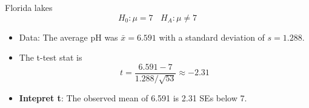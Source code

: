 \documentclass[
  10pt,
  ignorenonframetext,
]{beamer}
\newenvironment{Shaded}{\begin{snugshade}}{\end{snugshade}}
\newcommand{\DecValTok}[1]{\textcolor[rgb]{0.00,0.00,0.81}{#1}}
\newcommand{\FloatTok}[1]{\textcolor[rgb]{0.00,0.00,0.81}{#1}}
\newcommand{\FunctionTok}[1]{\textcolor[rgb]{0.00,0.00,0.00}{#1}}
\newcommand{\NormalTok}[1]{#1}
\newcommand{\SpecialCharTok}[1]{\textcolor[rgb]{0.00,0.00,0.00}{#1}}
\providecommand{\tightlist}{%
  \setlength{\itemsep}{0pt}\setlength{\parskip}{0pt}}
\let\oldShaded\Shaded
\let\endoldShaded\endShaded
\renewenvironment{Shaded}{\tiny\oldShaded}{\endoldShaded}
\begin{document}
\begin{frame}[fragile]{Florida lakes}
\protect\hypertarget{florida-lakes-2}{}
\[
H_0: \mu = 7 \ \ \ \  H_A: \mu \neq 7
\]

\begin{itemize}
\tightlist
\item
  Data: The average pH was \(\bar{x}=6.591\) with a standard deviation
  of \(s=1.288\).
\end{itemize}

\begin{Shaded}
\end{Shaded}

\begin{itemize}
\item
  The t-test stat is \[
  t = \dfrac{6.591 - 7}{1.288/\sqrt{53}} \approx -2.31
  \]
\item
  \textbf{Intepret t}: The observed mean of 6.591 is 2.31 SEs below 7.
\end{itemize}
\end{frame}
\end{document}
